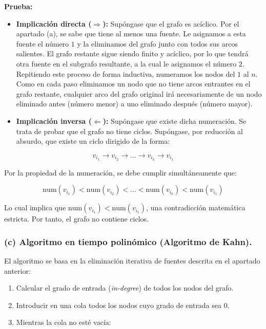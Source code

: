 \documentclass[12pt]{book} %
\providecommand{\tightlist}{%
  \setlength{\itemsep}{0pt}\setlength{\parskip}{0pt}}
\begin{document}
\textbf{Prueba:}

\begin{itemize}
\tightlist
\item
  \textbf{Implicación directa (\(\Rightarrow\)):} Supóngase que el grafo
  es acíclico. Por el apartado (a), se sabe que tiene al menos una
  fuente. Le asignamos a esta fuente el número \(1\) y la eliminamos del
  grafo junto con todos sus arcos salientes. El grafo restante sigue
  siendo finito y acíclico, por lo que tendrá otra fuente en el subgrafo
  resultante, a la cual le asignamos el número \(2\). Repitiendo este
  proceso de forma inductiva, numeramos los nodos del \(1\) al \(n\).
  Como en cada paso eliminamos un nodo que no tiene arcos entrantes en
  el grafo restante, cualquier arco del grafo original irá
  necesariamente de un nodo eliminado antes (número menor) a uno
  eliminado después (número mayor).
\item
  \textbf{Implicación inversa (\(\Leftarrow\)):} Supóngase que existe
  dicha numeración. Se trata de probar que el grafo no tiene ciclos.
  Supóngase, por reducción al absurdo, que existe un ciclo dirigido de
  la forma:
\end{itemize}

\[v_{i_1} \longrightarrow v_{i_2} \longrightarrow \dots \longrightarrow v_{i_k} \longrightarrow v_{i_1}\]

Por la propiedad de la numeración, se debe cumplir simultáneamente que:

\[\text{num}(v_{i_1}) < \text{num}(v_{i_2}) < \dots < \text{num}(v_{i_k}) < \text{num}(v_{i_1})\]

Lo cual implica que \(\text{num}(v_{i_1}) < \text{num}(v_{i_1})\), una
contradicción matemática estricta. Por tanto, el grafo no contiene
ciclos.

\hypertarget{c-algoritmo-en-tiempo-polinuxf3mico-algoritmo-de-kahn.}{%
\subsubsection{(c) Algoritmo en tiempo polinómico (Algoritmo de
Kahn).}\label{c-algoritmo-en-tiempo-polinuxf3mico-algoritmo-de-kahn.}}

El algoritmo se basa en la eliminación iterativa de fuentes descrita en
el apartado anterior:

\begin{enumerate}
\def\labelenumi{\arabic{enumi}.}
\tightlist
\item
  Calcular el grado de entrada (\emph{in-degree}) de todos los nodos del
  grafo.
\item
  Introducir en una cola todos los nodos cuyo grado de entrada sea
  \(0\).
\item
  Mientras la cola no esté vacía:
\end{enumerate}
\end{document}
